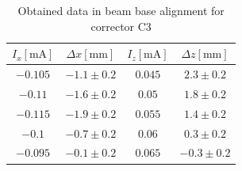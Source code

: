 \documentclass[12pt]{article}
\begin{document}
\begin{table}[H]
    \centering
    \begin{tabular}{c|c|c|c}
        \hline
        \hline
        $I_x \mathrm{[mA]}$ &   $\Delta x \mathrm{[mm]}$ &$I_z \mathrm{[mA]}$ & $\Delta z \mathrm{[mm]}$ \\
        \hline
        $ -0.105 $ & $ -1.1 \pm 0.2 $ & $ 0.045 $ & $ 2.3 \pm 0.2 $ \\ 
        $ -0.11 $ & $ -1.6 \pm 0.2 $ & $ 0.05 $ & $ 1.8 \pm 0.2 $ \\ 
        $ -0.115 $ & $ -1.9 \pm 0.2 $ & $ 0.055 $ & $ 1.4 \pm 0.2 $ \\ 
        $ -0.1 $ & $ -0.7 \pm 0.2 $ & $ 0.06 $ & $ 0.3 \pm 0.2 $ \\ 
        $ -0.095 $ & $ -0.1 \pm 0.2 $ & $ 0.065 $ & $ -0.3 \pm 0.2 $ \\  
        \hline
    \end{tabular}
    \caption{Obtained data in beam base alignment for corrector C3}
    \label{BC3row}
\end{table}
\end{document}

